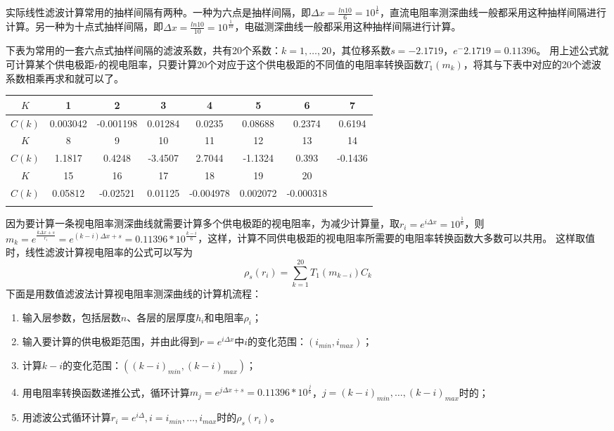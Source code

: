 \documentclass[hyperref,UTF-8,twoside]{ctexart}
\numberwithin{equation}{section}
\begin{document}
实际线性滤波计算常用的抽样间隔有两种。一种为六点是抽样间隔，即$\Delta x=\frac{ln10}{6}=10^\frac{1}{6}$，直流电阻率测深曲线一般都采用这种抽样间隔进行计算。另一种为十点式抽样间隔，即$\Delta x=\frac{ln10}{10}=10^\frac{1}{10}$，电磁测深曲线一般都采用这种抽样间隔进行计算。

下表为常用的一套六点式抽样间隔的滤波系数，共有20个系数：$k=1,\ldots,20$，其位移系数$s=-2.1719$，$e^-2.1719=0.11396$。
用上述公式就可计算某个供电极距$r$的视电阻率，只要计算20个对应于这个供电极距的不同值的电阻率转换函数$T_1(m_k)$，将其与下表中对应的20个滤波系数相乘再求和就可以了。
\begin{center}
\renewcommand\arraystretch{1}
\begin{tabular}{|c|c|c|c|c|c|c|c|}
\Xhline{1.5pt}
$K$&1&2&3&4&5&6&7\\\hline
$C(k)$&0.003042&-0.001198&0.01284&0.0235&0.08688&0.2374&0.6194\\
\Xhline{1.5pt}
$K$&8&9&10&11&12&13&14\\\hline
$C(k)$&1.1817&0.4248&-3.4507&2.7044&-1.1324&0.393&-0.1436\\
\Xhline{1.5pt}
$K$&15&16&17&18&19&20&\\\hline
$C(k)$&0.05812&-0.02521&0.01125&-0.004978&0.002072&-0.000318&\\
\Xhline{1.5pt}
\end{tabular}
\end{center}
\vspace{15pt}

因为要计算一条视电阻率测深曲线就需要计算多个供电极距的视电阻率，为减少计算量，取$r_i=e^{i\Delta x}=10^{\frac{1}{6}}$，则$m_k=e^{\frac{k\Delta x+s}{r_i}}=e^{(k-i)\Delta x+s}=0.11396*10^{\frac{k-i}{6}}$，这样，计算不同供电极距的视电阻率所需要的电阻率转换函数大多数可以共用。
这样取值时，线性滤波计算视电阻率的公式可以写为
\begin{equation}
\rho_s(r_i)=\sum_{k=1}^{20}T_1(m_{k-i})C_k\label{eq:3-25}
\end{equation}
下面是用数值滤波法计算视电阻率测深曲线的计算机流程：
\begin{enumerate}
\item 输入层参数，包括层数$n$、各层的层厚度$h_i$和电阻率$\rho_i$；
\item 输入要计算的供电极距范围，并由此得到$r=e^{i\Delta x}$中$i$的变化范围：$(i_{min},i_{max})$；
\item 计算$k-i$的变化范围：$((k-i)_{min},(k-i)_{max})$；
\item 用电阻率转换函数递推公式，循环计算$m_j=e^{j\Delta x+s}=0.11396*10^{\frac{j}{6}}$，$j=(k-i)_{min},\ldots,(k-i)_{max}$时的；
\item 用滤波公式循环计算$r_i=e^{i\Delta},i=i_{min},\ldots,i_{max}$时的$\rho_s(r_i)$。
\end{enumerate}
\end{document}
